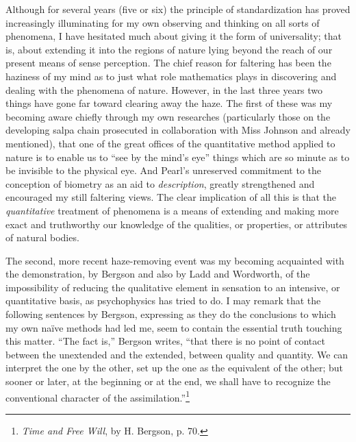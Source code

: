\documentclass[a4paper, 11pt, oneside, polutonikogreek, english]{article}
\begin{document}
Although for several years (five or six) the principle of standardization has proved increasingly illuminating for my own observing and thinking on all sorts of phenomena, I have hesitated much about giving it the form of universality; that is, about extending it into the regions of nature lying beyond the reach of our present means of sense perception. The chief reason for faltering has been the haziness of my mind as to just what role mathematics plays in discovering and dealing with the phenomena of nature. However, in the last three years two things have gone far toward clearing away the haze. The first of these was my becoming aware chiefly through my own researches (particularly those on the developing salpa chain prosecuted in collaboration with Miss Johnson and already mentioned), that one of the great offices of the quantitative method applied to nature is to enable us to ``see by the mind's eye'' things which are so minute as to be invisible to the physical eye. And Pearl's unreserved commitment to the conception of biometry as an aid to \emph{description}, greatly strengthened and encouraged my still faltering views. The clear implication of all this is that the \emph{quantitative} treatment of phenomena is a means of extending and making more exact and truthworthy our knowledge of the qualities, or properties, or attributes of natural bodies.

The second, more recent haze-removing event was my becoming acquainted with the demonstration, by Bergson and also by Ladd and Wordworth, of the impossibility of reducing the qualitative element in sensation to an intensive, or quantitative basis, as psychophysics has tried to do. I may remark that the following sentences by Bergson, expressing as they do the conclusions to which my own naïve methods had led me, seem to contain the essential truth touching this matter. ``The fact is,'' Bergson writes, ``that there is no point of contact between the unextended and the extended, between quality and quantity. We can interpret the one by the other, set up the one as the equivalent of the other; but sooner or later, at the beginning or at the end, we shall have to recognize the conventional character of the assimilation.''\footnote{\emph{Time and Free Will}, by H. Bergson, p. 70.}
\end{document}
